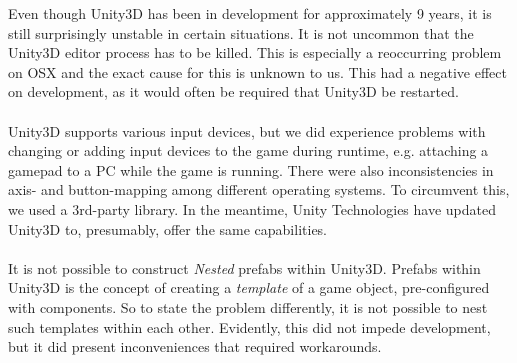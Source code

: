 Even though Unity3D has been in development for approximately 9 years, it is
still surprisingly unstable in certain situations. It is not uncommon that the
Unity3D editor process has to be killed. This is especially a
reoccurring problem on OSX and the exact cause for this is unknown to us. This
had a negative effect on development, as it would often be required that Unity3D
be restarted.
\\
\\
Unity3D supports various input devices, but we did experience problems with
changing or adding input devices to the game during runtime, e.g. attaching a
gamepad to a PC while the game is running. There were also inconsistencies in
axis- and button-mapping among different operating systems. To circumvent this,
we used a 3rd-party library. In the meantime, Unity Technologies have updated
Unity3D to, presumably, offer the same capabilities.
\\
\\
It is not possible to construct \textit{Nested} prefabs within Unity3D. Prefabs
within Unity3D is the concept of creating a \textit{template} of a game object,
pre-configured with components. So to state the problem differently, it is not
possible to nest such templates within each other. Evidently, this did not
impede development, but it did present inconveniences that required
workarounds.




%

